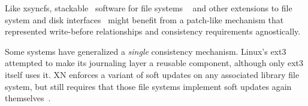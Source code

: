 %
%
%
%
Like xsyncfs, stackable \module\ software for file systems%
~\cite{rosenthal90evolving, skinner93stacking,
heidemann94filesystem,zadok99extending,
zadok00fist,wright03ncryptfs,wright06versatility} and other extensions
to file system and disk interfaces~\cite{huang05fs2,sivathanu06typesafe}
might
benefit from a patch-like mechanism that represented write-before
relationships and consistency requirements agnostically.

Some systems have generalized a \emph{single} consistency mechanism.
Linux's ext3 attempted to make its journaling layer a reusable component,
although only ext3 itself uses it.  XN enforces a variant of soft updates
on any associated library file system, but still requires that those file
systems implement soft updates again themselves~\cite{kaashoek97application}.

\begin{comment}
Previous
systems like FiST~\cite{zadok00fist} or GEOM~\cite{geom} generally focus on
an individual portion of the system and thus restrict both what a \module\
can do and how \modules\ can be arranged. FiST, for instance, does not
provide a way to deal with structures on the disk directly -- it provides
only ``wrapper'' functionality around existing file
systems. %
GEOM, on the other hand, deals only with the block device layer, and has no
way to work with the file systems stored on those block devices. Neither
has a formal way of specifying or honoring complex write-ordering
information, which is what \patches\ in \Kudos\ provide. We imagine that
systems like these could be adapted to work with \patches, giving the
benefits of both ideas.

\paragraph{Applications}

A variety of extensions to file systems and disk interfaces have been proposed
in recent work, like the FS2 Free Space File System~\cite{huang05fs2},
encrypting file systems like NCryptfs~\cite{wright03ncryptfs}, and type-safe
disks~\cite{sivathanu06typesafe}. The \Kudos\
\module\ system may provide an interesting platform for implementations 
of these ideas.
\end{comment}


